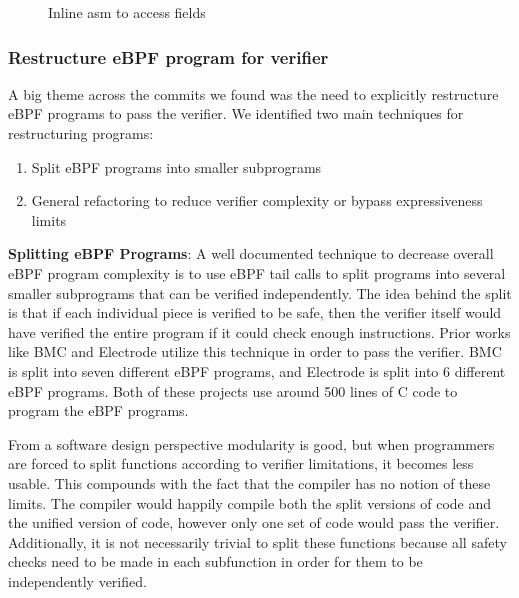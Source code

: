 \begin{figure}
    
    \caption{Inline asm to access fields}
    \label{fig:inline-asm}
\end{figure}

\subsubsection{Restructure eBPF program for verifier}
A big theme across the commits we found was the need to explicitly restructure eBPF programs to pass the verifier.
We identified two main techniques for restructuring programs:

\begin{enumerate}
    \item Split eBPF programs into smaller subprograms
    \item General refactoring to reduce verifier complexity or bypass expressiveness limits
\end{enumerate}

\textbf{Splitting eBPF Programs}:
A well documented technique to decrease overall eBPF program complexity is to use eBPF tail calls to split programs into several smaller subprograms that can be verified independently.
The idea behind the split is that if each individual piece is verified to be safe, then the verifier itself would have verified the entire program if it could check enough instructions.
Prior works like BMC\cite{BMC} and Electrode\cite{Electrode} utilize this technique in order to pass the verifier.
BMC is split into seven different eBPF programs, and Electrode is split into 6 different eBPF programs.
Both of these projects use around 500 lines of C code to program the eBPF programs.

From a software design perspective modularity is good, but when programmers are forced to split functions according to verifier limitations, it becomes less usable.
This compounds with the fact that the compiler has no notion of these limits.
The compiler would happily compile both the split versions of code and the unified version of code, however only one set of code would pass the verifier.
Additionally, it is not necessarily trivial to split these functions because all safety checks need to be made in each subfunction in order for them to be independently verified.

